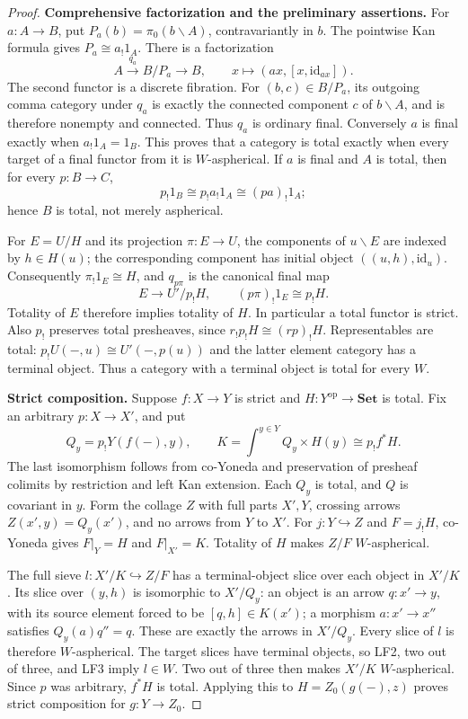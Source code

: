 \documentclass[11pt,a4paper]{article}
\theoremstyle{definition}
\theoremstyle{remark}
\newcommand{\Set}{\mathbf{Set}}
\newcommand{\op}{\mathrm{op}}
\newcommand{\id}{\mathrm{id}}
\begin{document}
\begin{proof}
\textbf{Comprehensive factorization and the preliminary assertions.}
For $a:A\to B$, put $P_a(b)=\pi_0(b\backslash A)$, contravariantly in $b$. The pointwise Kan formula gives $P_a\cong a_!1_A$. There is a factorization
\[
 A\xrightarrow{q_a}B/P_a\longrightarrow B,
 \qquad x\longmapsto (ax,[x,\id_{ax}]).
\]
The second functor is a discrete fibration. For $(b,c)\in B/P_a$, its outgoing comma category under $q_a$ is exactly the connected component $c$ of $b\backslash A$, and is therefore nonempty and connected. Thus $q_a$ is ordinary final. Conversely $a$ is final exactly when $a_!1_A=1_B$. This proves that a category is total exactly when every target of a final functor from it is $W$-aspherical. If $a$ is final and $A$ is total, then for every $p:B\to C$,
\[
 p_!1_B\cong p_!a_!1_A\cong(pa)_!1_A;
\]
hence $B$ is total, not merely aspherical.

For $E=U/H$ and its projection $\pi:E\to U$, the components of $u\backslash E$ are indexed by $h\in H(u)$; the corresponding component has initial object $((u,h),\id_u)$. Consequently $\pi_!1_E\cong H$, and $q_{p\pi}$ is the canonical final map
\[
 E\longrightarrow U'/p_!H,
 \qquad (p\pi)_!1_E\cong p_!H.
\]
Totality of $E$ therefore implies totality of $H$. In particular a total functor is strict. Also $p_!$ preserves total presheaves, since $r_!p_!H\cong(rp)_!H$. Representables are total: $p_!U(-,u)\cong U'(-,p(u))$ and the latter element category has a terminal object. Thus a category with a terminal object is total for every $W$.

\textbf{Strict composition.}
Suppose $f:X\to Y$ is strict and $H:Y^{\op}\to\Set$ is total. Fix an arbitrary $p:X\to X'$, and put
\[
 Q_y=p_!Y(f(-),y),\qquad
 K=\int^{y\in Y}Q_y\times H(y)\cong p_!f^*H.
\]
The last isomorphism follows from co-Yoneda and preservation of presheaf colimits by restriction and left Kan extension. Each $Q_y$ is total, and $Q$ is covariant in $y$. Form the collage $Z$ with full parts $X',Y$, crossing arrows $Z(x',y)=Q_y(x')$, and no arrows from $Y$ to $X'$. For $j:Y\hookrightarrow Z$ and $F=j_!H$, co-Yoneda gives $F|_Y=H$ and $F|_{X'}=K$. Totality of $H$ makes $Z/F$ $W$-aspherical.

The full sieve $l:X'/K\hookrightarrow Z/F$ has a terminal-object slice over each object in $X'/K$. Its slice over $(y,h)$ is isomorphic to $X'/Q_y$: an object is an arrow $q:x'\to y$, with its source element forced to be $[q,h]\in K(x')$; a morphism $a:x'\to x''$ satisfies $Q_y(a)q''=q$. These are exactly the arrows in $X'/Q_y$. Every slice of $l$ is therefore $W$-aspherical. The target slices have terminal objects, so LF2, two out of three, and LF3 imply $l\in W$. Two out of three then makes $X'/K$ $W$-aspherical. Since $p$ was arbitrary, $f^*H$ is total. Applying this to $H=Z_0(g(-),z)$ proves strict composition for $g:Y\to Z_0$.


\end{proof}
\end{document}
